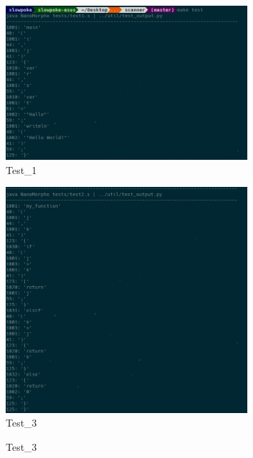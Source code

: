\documentclass{homework}
\begin{document}
\begin{answer}
  \begin{figure}[H]
    \centering
    \caption*{Test\_1}
    \includegraphics[width=0.8\textwidth]{test1.png}
  \end{figure}
  \begin{figure}[H]
    \centering
    \caption*{Test\_3}
    \includegraphics[width=0.8\textwidth]{test2.png}
  \end{figure}
  \begin{figure}[H]
    \centering
    \caption*{Test\_3}

\end{figure}
\end{answer}
\end{document}
